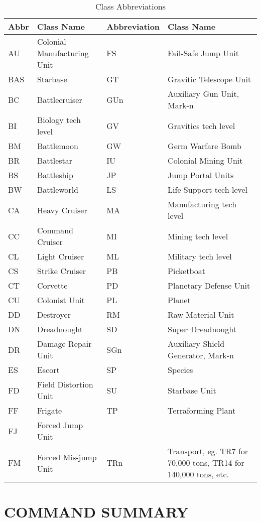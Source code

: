 \documentclass[10pt,titlepage]{article}
\begin{document}
\begin{table}[ht]
 \caption{Class Abbreviations} \label{tab:classabrvs}
\begin{tabularx}{\textwidth}{|lX|lX|}
\hline
\rowcolor{lightblue} \textbf{Abbr} &    \textbf{Class Name} & \textbf{Abbreviation} &    \textbf{Class Name}  \\
\hline
AU & Colonial Manufacturing Unit &	FS & Fail-Safe Jump Unit\\ 
BAS & Starbase& 	GT & Gravitic Telescope Unit\\ 
BC & Battlecruiser& 	GUn & Auxiliary Gun Unit, Mark-n\\ 
BI & Biology tech level& 	GV & Gravitics tech level\\ 
BM & Battlemoon& 	GW & Germ Warfare Bomb\\ 
BR & Battlestar& 	IU & Colonial Mining Unit\\ 
BS & Battleship& 	JP & Jump Portal Units\\ 
BW & Battleworld& 	LS & Life Support tech level\\ 
CA & Heavy Cruiser& 	MA & Manufacturing tech level\\ 
CC & Command Cruiser & MI & Mining tech level\\ 
CL & Light Cruiser & ML & Military tech level\\ 
CS & Strike Cruiser & PB & Picketboat\\ 
CT & Corvette & PD & Planetary Defense Unit\\ 
CU & Colonist Unit & PL & Planet\\ 
DD & Destroyer & RM & Raw Material Unit\\ 
DN & Dreadnought & SD & Super Dreadnought\\ 
DR & Damage Repair Unit & SGn & Auxiliary Shield Generator, Mark-n\\ 
ES & Escort & SP & Species\\ 
FD & Field Distortion Unit & SU & Starbase Unit\\ 
FF & Frigate & TP & Terraforming Plant\\ 
FJ & Forced Jump Unit & &\\
FM & Forced Mis-jump Unit  & TRn & Transport, eg. TR7 for 70,000 tons, TR14 for 140,000 tons, etc. \\ 	

\hline
\end{tabularx}
\end{table}
\newpage
\section{COMMAND SUMMARY}
\end{document}
